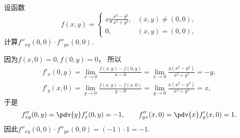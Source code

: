 \begin{example}
设函数\begin{equation*}
	f(x,y) = \left\{ \begin{array}{cl}
		x y \frac{x^2 - y^2}{x^2 + y^2}, & (x,y)\neq(0,0), \\
		0, & (x,y)=(0,0),
	\end{array} \right.
\end{equation*}
计算\(f''_{xy}(0,0) \cdot f''_{yx}(0,0)\).
\begin{solution}
因为\(f(x,0) = 0,
f(0,y) = 0\)，
所以\begin{gather*}
	f'_x(0,y) = \lim_{x\to0} \frac{f(x,y) - f(0,y)}{x - 0}
	= \lim_{x\to0} \frac{y (x^2 - y^2)}{x^2 + y^2}
	= -y, \\
	f'_y(x,0) = \lim_{y\to0} \frac{f(x,y) - f(x,0)}{y - 0}
	= \lim_{y\to0} \frac{x (x^2 - y^2)}{x^2 + y^2}
	= x,
\end{gather*}
于是\begin{equation*}
	f''_{xy}(0,y) = \pdv{y} f'_x(0,y) = -1,
	\qquad
	f''_{yx}(x,0) = \pdv{x} f'_y(x,0) = 1.
\end{equation*}
因此\(f''_{xy}(0,0) \cdot f''_{yx}(0,0) = (-1)\cdot1 = -1\).
\end{solution}
\end{example}
